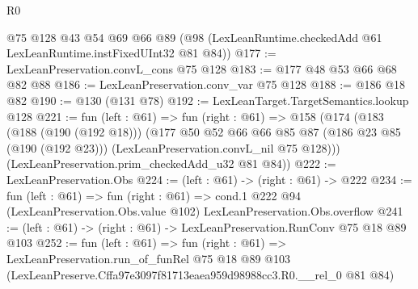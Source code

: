 \begin{lexlean}{R0}
\begin{coremodule}
    @75
    @128
    @43
    @54
    @69
    @66
    @89
    (@98 (LexLeanRuntime.checkedAdd @61 LexLeanRuntime.instFixedUInt32 @81 @84))
@177 := LexLeanPreservation.convL_cons @75 @128
@183 := @177 @48 @53 @66 @68 @82 @88
@186 := LexLeanPreservation.conv_var @75 @128
@188 := @186 @18 @82
@190 := @130 (@131 @78)
@192 := LexLeanTarget.TargetSemantics.lookup @128
@221 := fun (left : @61) =>
  fun (right : @61) =>
  @158
    (@174
      (@183
        (@188 (@190 (@192 @18)))
        (@177
          @50
          @52
          @66
          @66
          @85
          @87
          (@186 @23 @85 (@190 (@192 @23)))
          (LexLeanPreservation.convL_nil @75 @128)))
      (LexLeanPreservation.prim_checkedAdd_u32 @81 @84))
@222 := LexLeanPreservation.Obs
@224 := (left : @61) -> (right : @61) -> @222
@234 := fun (left : @61) =>
  fun (right : @61) =>
  cond.{1} @222 @94 (LexLeanPreservation.Obs.value @102) LexLeanPreservation.Obs.overflow
@241 := (left : @61) -> (right : @61) -> LexLeanPreservation.RunConv @75 @18 @89 @103
@252 := fun (left : @61) =>
  fun (right : @61) =>
  LexLeanPreservation.run_of_funRel
    @75
    @18
    @89
    @103
    (LexLeanPreserve.Cffa97e3097f81713eaea959d98988cc3.R0.__rel_0 @81 @84)
\end{coremodule}
\end{lexlean}
